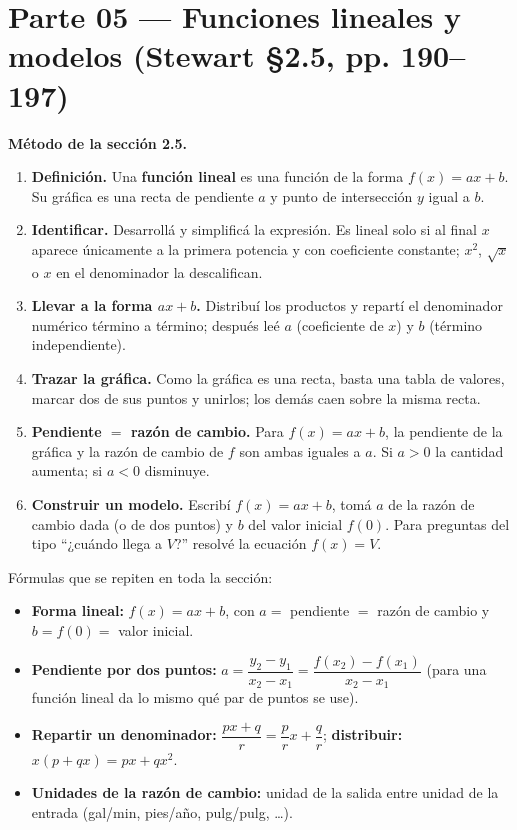 \documentclass[11pt]{article}
\begin{document}
\shorthandoff{<>}  %

\section*{Parte 05 — Funciones lineales y modelos (Stewart §2.5, pp. 190--197)}

\begin{teo}
\textbf{Método de la sección 2.5.}
\begin{enumerate}[leftmargin=*]
\item \textbf{Definición.} Una \textbf{función lineal} es una función de la forma $f(x)=ax+b$. Su gráfica es una recta de pendiente $a$ y punto de intersección $y$ igual a $b$.
\item \textbf{Identificar.} Desarrollá y simplificá la expresión. Es lineal solo si al final $x$ aparece únicamente a la primera potencia y con coeficiente constante; $x^2$, $\sqrt{x}$ o $x$ en el denominador la descalifican.
\item \textbf{Llevar a la forma $ax+b$.} Distribuí los productos y repartí el denominador numérico término a término; después leé $a$ (coeficiente de $x$) y $b$ (término independiente).
\item \textbf{Trazar la gráfica.} Como la gráfica es una recta, basta una tabla de valores, marcar dos de sus puntos y unirlos; los demás caen sobre la misma recta.
\item \textbf{Pendiente $=$ razón de cambio.} Para $f(x)=ax+b$, la pendiente de la gráfica y la razón de cambio de $f$ son ambas iguales a $a$. Si $a>0$ la cantidad aumenta; si $a<0$ disminuye.
\item \textbf{Construir un modelo.} Escribí $f(x)=ax+b$, tomá $a$ de la razón de cambio dada (o de dos puntos) y $b$ del valor inicial $f(0)$. Para preguntas del tipo ``¿cuándo llega a $V$?'' resolvé la ecuación $f(x)=V$.
\end{enumerate}
\end{teo}

\begin{tip}
Fórmulas que se repiten en toda la sección:
\begin{itemize}[leftmargin=*]
\item \textbf{Forma lineal:} $f(x)=ax+b$, con $a=$ pendiente $=$ razón de cambio y $b=f(0)=$ valor inicial.
\item \textbf{Pendiente por dos puntos:} $a=\dfrac{y_2-y_1}{x_2-x_1}=\dfrac{f(x_2)-f(x_1)}{x_2-x_1}$ (para una función lineal da lo mismo qué par de puntos se use).
\item \textbf{Repartir un denominador:} $\dfrac{px+q}{r}=\dfrac{p}{r}x+\dfrac{q}{r}$; \quad \textbf{distribuir:} $x(p+qx)=px+qx^2$.
\item \textbf{Unidades de la razón de cambio:} unidad de la salida entre unidad de la entrada (gal/min, pies/año, pulg/pulg, \dots).
\end{itemize}
\end{tip}
\end{document}
